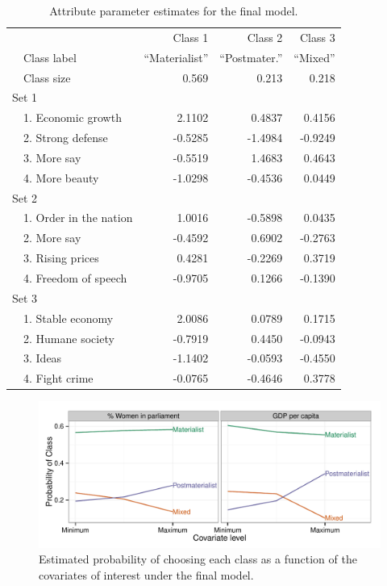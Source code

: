 \documentclass[letterpaper,12pt]{article}
\begin{document}
\begin{table}\centering
	\begin{tabular}{llrrr}
	\hline
			&&	Class 1	&	Class 2	&	Class 3\\
			&Class label& ``Materialist'' & ``Postmater.'' & ``Mixed''\\
& Class size & 0.569 & 0.213 & 0.218\\
				\hline
\multicolumn{3}{l}{Set 1}\\
& 1. Economic growth	&	2.1102	&	0.4837	&	0.4156\\
& 2. Strong defense	&	-0.5285	&	-1.4984	&	-0.9249\\
& 3. More say	&	-0.5519	&	1.4683	&	0.4643\\
& 4. More beauty	&	-1.0298	&	-0.4536	&	0.0449\\
\multicolumn{3}{l}{Set 2}\\
& 1. Order in the nation	&	1.0016	&	-0.5898	&	0.0435\\
& 2. More say	&	-0.4592	&	0.6902	&	-0.2763\\
& 3. Rising prices	&	0.4281	&	-0.2269	&	0.3719\\
& 4. Freedom of speech	&	-0.9705	&	0.1266	&	-0.1390\\
\multicolumn{3}{l}{Set 3}\\
& 1. Stable economy	&	2.0086	&	0.0789	&	0.1715\\
& 2. Humane society	&	-0.7919	&	0.4450	&	-0.0943\\
& 3. Ideas	&	-1.1402	&	-0.0593	&	-0.4550\\
& 4. Fight crime	&	-0.0765	&	-0.4646	&	0.3778\\
	\hline
	\end{tabular}
	\caption{\label{tab:attribute-parameters}Attribute parameter estimates for the 
		final model.}

\end{table}


\begin{figure}
	\includegraphics[width=\textwidth]{figures/covariates.pdf}
	\caption{\label{fig:covariates}Estimated probability of choosing each class as a function of the covariates of interest under the final model.}
\end{figure}
\end{document}
